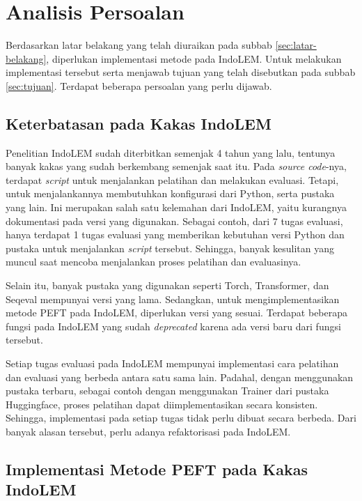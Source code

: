 \section{Analisis Persoalan}
\label{sec:analisis-persoalan}

Berdasarkan latar belakang yang telah diuraikan pada subbab \ref{sec:latar-belakang}, diperlukan implementasi metode \PEFT pada IndoLEM. Untuk melakukan implementasi tersebut serta menjawab tujuan yang telah disebutkan pada subbab \ref{sec:tujuan}. Terdapat beberapa persoalan yang perlu dijawab.

\subsection{Keterbatasan pada Kakas IndoLEM}

Penelitian IndoLEM sudah diterbitkan semenjak 4 tahun yang lalu, tentunya banyak kakas yang sudah berkembang semenjak saat itu. Pada \textit{source code}-nya, terdapat \textit{script} untuk menjalankan pelatihan dan melakukan evaluasi. Tetapi, untuk menjalankannya membutuhkan konfigurasi dari Python, serta pustaka yang lain. Ini merupakan salah satu kelemahan dari IndoLEM, yaitu kurangnya dokumentasi pada versi yang digunakan. Sebagai contoh, dari 7 tugas evaluasi, hanya terdapat 1 tugas evaluasi yang memberikan kebutuhan versi Python dan pustaka untuk menjalankan \textit{script} tersebut. Sehingga, banyak kesulitan yang muncul saat mencoba menjalankan proses pelatihan dan evaluasinya.

Selain itu, banyak pustaka yang digunakan seperti Torch, Transformer, dan Seqeval mempunyai versi yang lama. Sedangkan, untuk mengimplementasikan metode PEFT pada IndoLEM, diperlukan versi yang sesuai. Terdapat beberapa fungsi pada IndoLEM yang sudah \textit{deprecated} karena ada versi baru dari fungsi tersebut.

Setiap tugas evaluasi pada IndoLEM mempunyai implementasi cara pelatihan dan evaluasi yang berbeda antara satu sama lain. Padahal, dengan menggunakan pustaka terbaru, sebagai contoh dengan menggunakan Trainer dari pustaka Huggingface, proses pelatihan dapat diimplementasikan secara konsisten. Sehingga, implementasi pada setiap tugas tidak perlu dibuat secara berbeda. Dari banyak alasan tersebut, perlu adanya refaktorisasi pada IndoLEM.

\subsection{Implementasi Metode PEFT pada Kakas IndoLEM}

